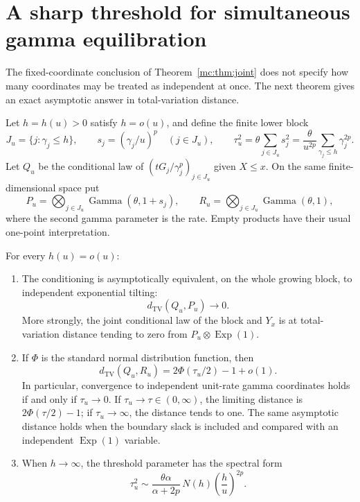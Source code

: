 \section{A sharp threshold for simultaneous gamma equilibration}
\label{mc:sec:threshold}

The fixed-coordinate conclusion of Theorem~\ref{mc:thm:joint} does not
specify how many coordinates may be treated as independent at once.
The next theorem gives an exact asymptotic answer in total-variation
distance.

Let $h=h(u)>0$ satisfy $h=o(u)$, and define the finite lower block
\[
 J_u=\{j:\gamma_j\leq h\},\qquad
 s_j=(\gamma_j/u)^p\quad(j\in J_u),\qquad
 \tau_u^2=\theta\sum_{j\in J_u}s_j^2
          =\frac\theta{u^{2p}}
            \sum_{\gamma_j\leq h}\gamma_j^{2p}.
\]
Let $Q_u$ be the conditional law of
$(tG_j/\gamma_j^p)_{j\in J_u}$ given $X\leq x$.  On the same
finite-dimensional space put
\[
 P_u=\bigotimes_{j\in J_u}\operatorname{Gamma}(\theta,1+s_j),
 \qquad
 R_u=\bigotimes_{j\in J_u}\operatorname{Gamma}(\theta,1),
\]
where the second gamma parameter is the rate.  Empty products have
their usual one-point interpretation.

\begin{theorem}\label{mc:thm:threshold}
For every $h(u)=o(u)$:
\begin{enumerate}
\item The conditioning is asymptotically equivalent, on the whole
growing block, to independent exponential tilting:
\begin{equation}\label{mc:eq:canonical}
 d_{\mathrm{TV}}(Q_u,P_u)\longrightarrow0.
\end{equation}
More strongly, the joint conditional law of the block and $Y_x$ is
at total-variation distance tending to zero from
$P_u\otimes\operatorname{Exp}(1)$.

\item If $\Phi$ is the standard normal distribution function, then
\begin{equation}\label{mc:eq:sharpTV}
 d_{\mathrm{TV}}(Q_u,R_u)
 =2\Phi(\tau_u/2)-1+o(1).
\end{equation}
In particular, convergence to independent unit-rate gamma coordinates
holds if and only if $\tau_u\to0$.  If $\tau_u\to\tau\in(0,\infty)$,
the limiting distance is $2\Phi(\tau/2)-1$; if $\tau_u\to\infty$, the
distance tends to one.  The same asymptotic distance holds when the
boundary slack is included and compared with an independent
$\operatorname{Exp}(1)$ variable.

\item When $h\to\infty$, the threshold parameter has the spectral form
\begin{equation}\label{mc:eq:tauRV}
 \tau_u^2\sim
 \frac{\theta\alpha}{\alpha+2p}\,
 N(h)\left(\frac hu\right)^{2p}.
\end{equation}
\end{enumerate}
\end{theorem}

